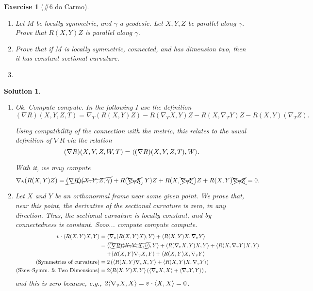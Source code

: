 \documentclass{article}
\theoremstyle{plain}
\newtheorem*{ex}{Exercise}
\theoremstyle{nonumberplain}
\newtheorem{sol}{Solution}
\DeclarePairedDelimiter{\braket}{\langle}{\rangle}
\begin{document}
\begin{ex}[\#6 do Carmo]
\leavevmode
\begin{enumerate}
\item Let $M$ be locally symmetric, and $\gamma$ a geodesic. Let $X, Y, Z$ be parallel along $\gamma$. Prove that $R(X,Y)Z$ is parallel along $\gamma$.
\item Prove that if $M$ is locally symmetric, connected, and has dimension two, then it has constant sectional curvature.
\item
\end{enumerate}
\end{ex}

\begin{sol}
\leavevmode
\begin{enumerate}
\item Ok. Compute compute. In the following I use the definition
\begin{equation}
(\nabla R)(X,Y,Z,T) = \nabla_T (R(X,Y)Z) - R(\nabla_T X, Y)Z - R(X,\nabla_T Y)Z - R(X,Y)(\nabla_T Z).
\end{equation}

Using compatibility of the connection with the metric, this relates to the usual definition of $\nabla R$ via the relation
\begin{equation}
(\nabla R)(X,Y,Z,W,T) = \braket{(\nabla R)(X,Y,Z,T), W}.
\end{equation}

With it, we may compute
\begin{equation}
\nabla_{\dot\gamma} (R(X,Y)Z) = \cancel{(\nabla R)(X,Y,Z,\dot\gamma)} + R(\xcancel{\nabla_{\dot\gamma} X}, Y) Z + R(X, \xcancel{\nabla_{\dot\gamma} Y}) Z + R(X, Y) \xcancel{\nabla_{\dot\gamma}Z} = 0.
\end{equation}
\item Let $X$ and $Y$ be an orthonormal frame near some given point. We prove that, near this point, the derivative of the sectional curvature is zero, in any direction. Thus, the sectional curvature is locally constant, and by connectedness is constant. Sooo... compute compute compute.
\begin{equation}
\begin{aligned}
v \cdot \braket{R(X,Y)X, Y} &= \braket{\nabla_v (R(X,Y)X), Y} + \braket{R(X,Y)X, \nabla_v Y}\\
&= \braket{\xcancel{(\nabla R)(X,Y,X,v)}, Y} + \braket{R(\nabla_v X,Y)X, Y} + \braket{R(X,\nabla_v Y)X, Y}\\
&\mathrel{\phantom{=}} + \braket{R(X,Y)\nabla_v X, Y} + \braket{R(X,Y)X, \nabla_v Y}\\
\text{(Symmetries of curvature)} &= 2 \left( \braket{R(X,Y)\nabla_v X, Y} + \braket{R(X,Y)X, \nabla_v Y} \right) \\
\text{(Skew-Symm. \& Two Dimensions)}&= 2 \braket{R(X,Y) X, Y} \left( \braket{\nabla_v X, X} + \braket{ \nabla_v Y, Y } \right),
\end{aligned}
\end{equation}
and this is zero because, e.g., $2 \braket{\nabla_v X, X} = v \cdot \braket{X,X} = 0$.


\end{enumerate}
\end{sol}
\end{document}
